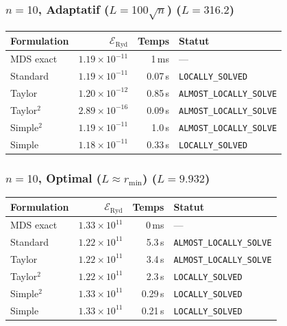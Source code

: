 \subsubsection{$n=10$, Adaptatif ($L{=}100\sqrt{n}$) ($L=316.2$)}
\begin{longtable}{@{}lrrl@{}}
  \toprule
  Formulation & $\mathcal{E}_{\mathrm{Ryd}}$ & Temps & Statut \\
  \midrule
  \endhead
  MDS exact & $1.19\times10^{-11}$ & 1\,ms & --- \\
  Standard & $1.19\times10^{-11}$ & 0.07\,s & \texttt{LOCALLY\_SOLVED} \\
  Taylor & $1.20\times10^{-12}$ & 0.85\,s & \texttt{ALMOST\_LOCALLY\_SOLVE} \\
  Taylor$^2$ & $2.89\times10^{-16}$ & 0.09\,s & \texttt{ALMOST\_LOCALLY\_SOLVE} \\
  Simple$^2$ & $1.19\times10^{-11}$ & 1.0\,s & \texttt{ALMOST\_LOCALLY\_SOLVE} \\
  Simple & $1.18\times10^{-11}$ & 0.33\,s & \texttt{LOCALLY\_SOLVED} \\
  \bottomrule
\end{longtable}

\subsubsection{$n=10$, Optimal ($L{\approx}r_{\min}$) ($L=9.932$)}
\begin{longtable}{@{}lrrl@{}}
  \toprule
  Formulation & $\mathcal{E}_{\mathrm{Ryd}}$ & Temps & Statut \\
  \midrule
  \endhead
  MDS exact & $1.33\times10^{11}$ & 0\,ms & --- \\
  Standard & $1.22\times10^{11}$ & 5.3\,s & \texttt{ALMOST\_LOCALLY\_SOLVE} \\
  Taylor & $1.22\times10^{11}$ & 3.4\,s & \texttt{ALMOST\_LOCALLY\_SOLVE} \\
  Taylor$^2$ & $1.22\times10^{11}$ & 2.3\,s & \texttt{LOCALLY\_SOLVED} \\
  Simple$^2$ & $1.33\times10^{11}$ & 0.29\,s & \texttt{LOCALLY\_SOLVED} \\
  Simple & $1.33\times10^{11}$ & 0.21\,s & \texttt{LOCALLY\_SOLVED} \\
  \bottomrule
\end{longtable}

